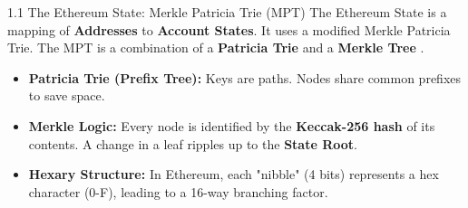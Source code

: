 \documentclass{beamer}
\begin{document}


\begin{frame}{1.1 The Ethereum State: Merkle Patricia Trie (MPT)}
The Ethereum State is a mapping of \textbf{Addresses} to \textbf{Account States}. It uses a modified Merkle Patricia Trie.
    The MPT is a combination of a \textbf{Patricia Trie} and a \textbf{Merkle Tree} .
    \begin{itemize}
        \item \textbf{Patricia Trie (Prefix Tree):} Keys are paths. Nodes share common prefixes to save space.
        \item \textbf{Merkle Logic:} Every node is identified by the \textbf{Keccak-256 hash} of its contents. A change in a leaf ripples up to the \textbf{State Root}.
        \item \textbf{Hexary Structure:} In Ethereum, each "nibble" (4 bits) represents a hex character (0-F), leading to a 16-way branching factor.
    \end{itemize}
        
        
        
\end{frame}
\end{document}
